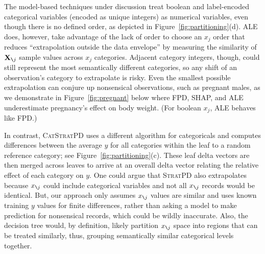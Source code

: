 \documentclass[]{article} %
\newcommand{\figref}[1]{Figure~\ref{#1}}
\newcommand{\cut}[1]{}
\newcommand{\spd}{\fontfamily{cmr}\textsc{\small StratPD}}
\newcommand{\cspd}{\fontfamily{cmr}\textsc{\small CatStratPD}}
\newcommand{\Xnj}{${\bf X}_{\texttt{\char`\\} j}$}
\newcommand{\xnj}{$x_{\texttt{\char`\\} j}$}
\renewcommand{\slash}{\texttt{\char`\\}}
\DeclareMathOperator{\Ex}{\mathbb{E}}
\begin{document}
The model-based techniques under discussion treat boolean and label-encoded categorical variables (encoded as unique integers) as numerical variables, even though there is no defined order, as depicted in \figref{fig:partitioning}(d). ALE does, however, take advantage of the lack of order to choose an $x_j$ order that reduces ``extrapolation outside the data envelope'' by measuring the similarity of \Xnj{} sample values across $x_j$ categories.  Adjacent category integers, though, could still represent the most semantically different categories, so any shift of an observation's category to extrapolate is risky. Even the smallest possible extrapolation can conjure up nonsensical observations, such as pregnant males, as we demonstrate in \figref{fig:pregnant} below where FPD, SHAP, and ALE underestimate pregnancy's effect on body weight. (For boolean $x_j$, ALE behaves like FPD.)  

In contrast, \cspd{} uses a different algorithm for categoricals and computes differences between the average $y$ for all categories within the leaf to a random reference category; see \figref{fig:partitioning}(c). These leaf delta vectors are then merged across leaves to arrive at an overall delta vector relating the relative effect of each category on $y$.  One could argue that \spd{} also extrapolates because \xnj{} could include categorical variables and not all \xnj{} records would be identical. But, our approach only assumes \xnj{} values are similar and uses known training $y$ values for finite differences, rather than asking a model to make prediction for nonsensical records, which could be wildly inaccurate. Also, the decision tree would, by definition, likely partition \xnj{} space into regions that can be treated similarly, thus, grouping semantically similar categorical levels together.

\cut{
{\bf Comparison}

${\it FPD}_j(z) = \Ex[\hat{f}(x_{j}=z,{\bf X}_{\slash j})])$

SHAP for one $S$ is $\phi_j(\hat{f},{\bf x}) = \Ex[\hat{f}(x_{S \cup \{j\}},{\bf X}_{\slash (S \cup \{j\})})  | {\bf X}_{S \cup \{j\}} = x_{S \cup \{j\}}] - \Ex[\hat{f}(x_{S},{\bf X}_{\slash S})  | {\bf X}_S = x_S ]$ for all subsets $S \subset F$ for $F = \{1, 2, .., p\}$. When $S = F \slash \{j\}$, like ALE, it becomes $\Ex[\hat{f}(x_F)] - \Ex[\hat{f}(x_{F \slash \{j\}},{\bf X}_j)]$ or $\hat{f}({\bf x}) - \text{\it FPD}_{F \slash \{j\}}(x)$ if assume independence.

ALE at $x_j=z$, it is cumsum of $\Ex[\hat{f}(b_k, {\bf X}_{\slash j}) - \hat{f}(b_{k-1}, {\bf X}_{\slash j}) \, | \, x_j \in (b_{k-1},b_k]]$ for bin $b_k$ partitioning min..max for var $j$ into $K$ intervals.

StratPD at $x_j=z$ is $\Ex[ (y^{(i_L+1)} - y^{i_L})/(x_j^{(i_L+1)} - x_j^{(i_L)}) \, | \, z \in [x_j^{(i_L+1)} - x_j^{(i_L)}) \text{ and } L \in T]$

$\Ex[ \phi_j(\hat{f},x) | {\bf X}_j = z] = FPD_j(x) - \bar{y}$ if features independent. SHAP's implementation approximates $\hat{f}$ trained on just $S$ features, $\hat{f}_S(x_S)$, with $\Ex[\hat{f}(x_{S},{\bf X}_{\bar{S}})]$ by assuming independent features.
}
\end{document}
